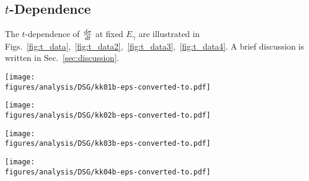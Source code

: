 \subsection{$t$-Dependence}
\label{tDep}
The $t$-dependence of $\frac{\lowercase{d}\sigma}{\lowercase{d}t}$ at fixed $E_{\gamma}$ are illustrated in Figs.~\ref{fig:t_data},~\ref{fig:t_data2},~\ref{fig:t_data3},~\ref{fig:t_data4}. A brief discussion is written in Sec.~\ref{sec:discussion}.
\begin{figure*}[htb!]
\texttt{[image: \\figures/analysis/DSG/kk01b-eps-converted-to.pdf]}
\caption[$\pi^0$ photoproduction cross section, $(d\sigma/dt)$, off the proton at $E_{\gamma}$ = 1275 -- 2225~MeV versus momentum transfer $t$]{\label{fig:t_data}(Color online) $\pi^0$ photoproduction cross section, $(d\sigma/dt)$, off the proton at $E_{\gamma}$ = 1275 -- 2225~MeV versus momentum transfer $t$. Notation as in Fig.~\protect\ref{fig:results.xsection1}.}
\end{figure*}

\begin{figure*}[htb!]
\texttt{[image: \\figures/analysis/DSG/kk02b-eps-converted-to.pdf]}
\caption[$\pi^0$ photoproduction cross section, $(d\sigma/dt)$, off the proton at $E_{\gamma}$ = 2275 -- 3375~MeV versus momentum transfer $t$]{\label{fig:t_data2}(Color online) $\pi^0$ photoproduction cross section, $(d\sigma/dt)$, off the proton at $E_{\gamma}$ = 2275 -- 3375~MeV versus momentum transfer $t$. Notation as in Fig.~\protect\ref{fig:results.xsection1}.}
\end{figure*}

\begin{figure*}[htb!]
\texttt{[image: \\figures/analysis/DSG/kk03b-eps-converted-to.pdf]}
\caption[$\pi^0$ photoproduction cross section, $(d\sigma/dt)$, off the proton at $E_{\gamma}$ = 3425 -- 4425~MeV versus momentum transfer $t$]{\label{fig:t_data3}(Color online) $\pi^0$ photoproduction cross section, $(d\sigma/dt)$, off the proton at $E_{\gamma}$ = 3425 -- 4425~MeV versus momentum transfer $t$. Notation as in Fig.~\protect\ref{fig:results.xsection1}.}
\end{figure*}

\begin{figure*}[htb!]
\texttt{[image: \\figures/analysis/DSG/kk04b-eps-converted-to.pdf]}
\caption[$\pi^0$ photoproduction cross section, $(d\sigma/dt)$, off the proton at  $E_{\gamma}$ = 4475 -- 5425~MeV versus momentum transfer $t$]{\label{fig:t_data4}(Color online) $\pi^0$ photoproduction cross section, $(d\sigma/dt)$, off the proton at  $E_{\gamma}$ = 4475 -- 5425~MeV versus momentum transfer $t$. Notation as in Fig.~\protect\ref{fig:results.xsection1}.}
\end{figure*}


